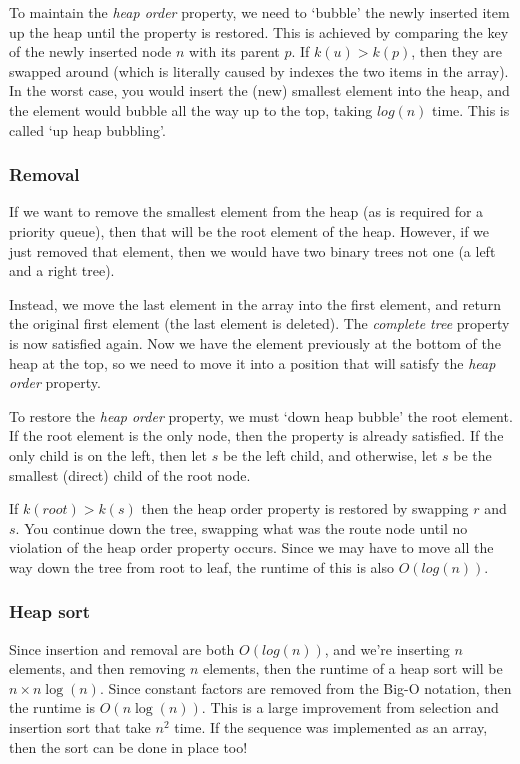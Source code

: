 To maintain the \textit{heap order} property, we need to `bubble' the newly
inserted item up the heap until the property is restored. This is achieved by
comparing the key of the newly inserted node $n$ with its parent $p$. If $k(u)
> k(p)$, then they are swapped around (which is literally caused by indexes
the two items in the array). In the worst case, you would insert the (new)
smallest element into the heap, and the element would bubble all the way up to
the top, taking $log(n)$ time. This is called `up heap bubbling'.

\subsubsection{Removal}

If we want to remove the smallest element from the heap (as is required for a
priority queue), then that will be the root element of the heap. However, if we
just removed that element, then we would have two binary trees not one (a left
and a right tree).

Instead, we move the last element in the array into the first element, and
return the original first element (the last element is deleted). The
\textit{complete tree} property is now satisfied again. Now we have the element
previously at the bottom of the heap at the top, so we need to move it into a
position that will satisfy the  \textit{heap order} property.

To restore the \textit{heap order} property, we must `down heap bubble' the
root element. If the root element is the only node, then the property is
already satisfied. If the only child is on the left, then let $s$ be the left
child, and otherwise, let $s$ be the smallest (direct) child of the root node.

If $k(root) > k(s)$ then the heap order property is restored by swapping $r$
and $s$. You continue down the tree, swapping what was the route node until no
violation of the heap order property occurs. Since we may have to move all the
way down the tree from root to leaf, the runtime of this is also $O(log(n))$.

\subsubsection{Heap sort}

Since insertion and removal are both $O(log(n))$, and we're inserting $n$
elements, and then removing $n$ elements, then the runtime of a heap sort will
be $n \times n \log(n)$. Since constant factors are removed from the Big-O
notation, then the runtime is $O(n \log(n))$. This is a large improvement from
selection and insertion sort that take $n^2$ time. If the sequence was
implemented as an array, then the sort can be done in place too!

